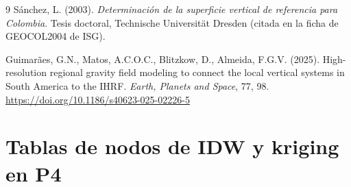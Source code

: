 \documentclass[11pt,letterpaper]{article}
\begin{document}
\begin{thebibliography}{9}
Sánchez, L. (2003). \textit{Determinación de la superficie vertical de referencia para Colombia}.
Tesis doctoral, Technische Universität Dresden (citada en la ficha de GEOCOL2004 de ISG).

Guimarães, G.N., Matos, A.C.O.C., Blitzkow, D., Almeida, F.G.V. (2025). High-resolution
regional gravity field modeling to connect the local vertical systems in South America to
the IHRF. \textit{Earth, Planets and Space}, 77, 98.
\url{https://doi.org/10.1186/s40623-025-02226-5}


\end{thebibliography}

\appendix
\section{Tablas de nodos de IDW y kriging en P4}
\label{anx:tablas}
\end{document}
